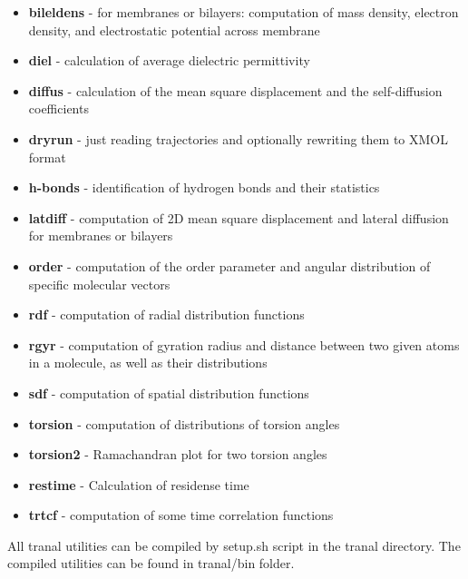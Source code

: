 \documentclass{article}
\begin{document}
\begin{itemize}

\item
{\bf bileldens} - for membranes or bilayers: computation of mass density, 
electron density, and electrostatic potential across membrane

\item
{\bf diel} - calculation of average dielectric permittivity 

\item
{\bf diffus} - calculation of the mean square displacement and the 
self-diffusion coefficients

\item
{\bf dryrun} - just reading trajectories and optionally rewriting 
them to XMOL format

\item
{\bf h-bonds} - identification of hydrogen bonds and their statistics

\item
{\bf latdiff} - computation of 2D mean square displacement and lateral
diffusion for membranes or bilayers

\item
{\bf order} - computation of the order parameter and angular distribution 
of specific molecular vectors 

\item
{\bf rdf} - computation of radial distribution functions

\item
  {\bf rgyr} - computation of gyration radius and distance between two
  given atoms in a  molecule, as well as their distributions

\item
{\bf sdf} - computation of spatial distribution functions

\item
{\bf torsion} - computation of distributions of torsion angles

\item
{\bf torsion2} - Ramachandran plot for two torsion angles

\item
{\bf restime} - Calculation of residense time 

\item
{\bf trtcf} - computation of some time correlation functions

\end{itemize}
 
All tranal utilities can be compiled by setup.sh script in the tranal directory.
The compiled utilities can be found in tranal/bin folder.
\end{document}
